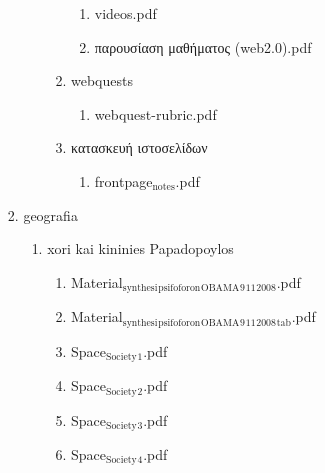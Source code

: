 \documentclass[11pt]{article}
\begin{document}
\begin{enumerate}
\begin{enumerate}
\begin{enumerate}
\begin{enumerate}
\begin{enumerate}
\begin{enumerate}
\item videos.pdf
\label{sec-1-1-1-1-49-2-2-1-64-1-1-1-2}

\item παρουσίαση μαθήματος (web2.0).pdf
\label{sec-1-1-1-1-49-2-2-1-64-1-1-1-3}
\end{enumerate}

\item webquests
\label{sec-1-1-1-1-49-2-2-1-64-1-1-2}
\begin{enumerate}
\item webquest-rubric.pdf
\label{sec-1-1-1-1-49-2-2-1-64-1-1-2-1}
\end{enumerate}

\item κατασκευή ιστοσελίδων
\label{sec-1-1-1-1-49-2-2-1-64-1-1-3}
\begin{enumerate}
\item frontpage$_{\text{notes}}$.pdf
\label{sec-1-1-1-1-49-2-2-1-64-1-1-3-1}
\end{enumerate}
\end{enumerate}
\end{enumerate}

\item geografia
\label{sec-1-1-1-1-49-2-2-1-64-2}
\begin{enumerate}
\item xori kai kininies Papadopoylos
\label{sec-1-1-1-1-49-2-2-1-64-2-1}
\begin{enumerate}
\item Material$_{\text{synthesi}}$$_{\text{psifoforon}}$$_{\text{OBAMA}}$$_{\text{9}}$$_{\text{11}}$$_{\text{2008}}$.pdf
\label{sec-1-1-1-1-49-2-2-1-64-2-1-1}

\item Material$_{\text{synthesi}}$$_{\text{psifoforon}}$$_{\text{OBAMA}}$$_{\text{9}}$$_{\text{11}}$$_{\text{2008}}$$_{\text{tab}}$.pdf
\label{sec-1-1-1-1-49-2-2-1-64-2-1-2}

\item Space$_{\text{Society}}$$_{\text{1}}$.pdf
\label{sec-1-1-1-1-49-2-2-1-64-2-1-3}

\item Space$_{\text{Society}}$$_{\text{2}}$.pdf
\label{sec-1-1-1-1-49-2-2-1-64-2-1-4}

\item Space$_{\text{Society}}$$_{\text{3}}$.pdf
\label{sec-1-1-1-1-49-2-2-1-64-2-1-5}

\item Space$_{\text{Society}}$$_{\text{4}}$.pdf
\label{sec-1-1-1-1-49-2-2-1-64-2-1-6}


\end{enumerate}
\end{enumerate}
\end{enumerate}
\end{enumerate}
\end{enumerate}
\end{document}
